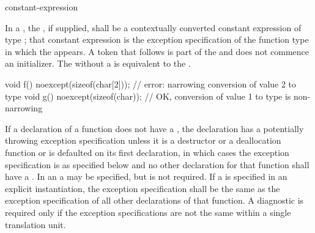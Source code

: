 \begin{bnf}
\br
     \terminal{(} constant-expression \terminal{)}\br
    \br
\end{bnf}

\pnum
{}%
In a , the ,
if supplied, shall be a contextually converted constant expression
of type ;
that constant expression is the exception specification of
the function type in which the  appears.
A \tcode{(} token that follows  is part of the
 and does not commence an
initializer.
The  
without a 
is
equivalent to the 
.
\begin{example}
\begin{codeblock}
void f() noexcept(sizeof(char[2])); // error: narrowing conversion of value 2 to type 
void g() noexcept(sizeof(char));    // OK, conversion of value 1 to type  is non-narrowing
\end{codeblock}
\end{example}

\pnum
If a declaration of a function
does not have a ,
the declaration has a potentially throwing exception specification
unless it is a destructor or a deallocation function
or is defaulted on its first declaration,
in which cases the exception specification
is as specified below
and no other declaration for that function
shall have a .
In an 
a  may be specified,
but is not required.
If a  is specified
in an explicit instantiation,
the exception specification shall be the same as
the exception specification of all other declarations of that function.
A diagnostic is required only if the
exception specifications are not the same
within a single translation unit.

